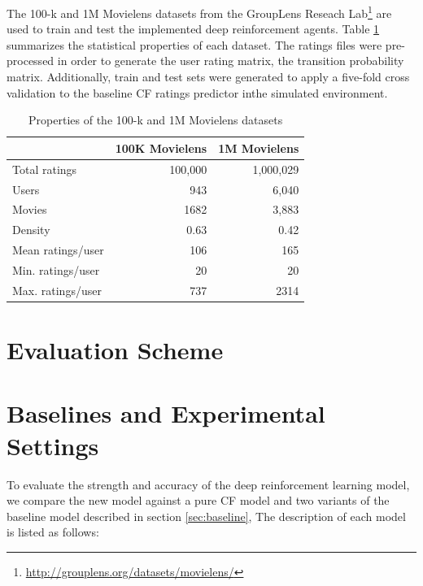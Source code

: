The 100-k and 1M Movielens datasets \cite{harper2016movielens} from the GroupLens Reseach Lab\footnote{\url{http://grouplens.org/datasets/movielens/}} are used to train and test the implemented deep reinforcement agents. Table \ref{table:dataset} summarizes the statistical properties of each dataset. The ratings files were pre-processed in order to generate the user rating matrix, the transition probability matrix. Additionally, train and test sets were generated to apply a five-fold cross validation to the baseline CF ratings predictor inthe simulated environment.

\begin{table}[!htbp]
\centering
\begin{tabular}{ |l|r|r| }
  \hline
  & 100K Movielens & 1M Movielens \\
  \hline
  Total ratings & 100,000 & 1,000,029 \\
  Users & 943 & 6,040 \\
  Movies & 1682 & 3,883 \\
  Density & 0.63 & 0.42 \\
  Mean ratings/user & 106 & 165 \\
  Min. ratings/user & 20 & 20 \\
  Max. ratings/user & 737 & 2314 \\
  \hline
\end{tabular}
\caption{Properties of the 100-k and 1M Movielens datasets}
\label{table:dataset}
\end{table}

\section{Evaluation Scheme}

\section{Baselines and Experimental Settings}

To evaluate the strength and accuracy of the deep reinforcement learning model, we compare the new model against a pure CF model and two variants of the baseline model described in section \ref{sec:baseline}, The description of each model is listed as follows:

